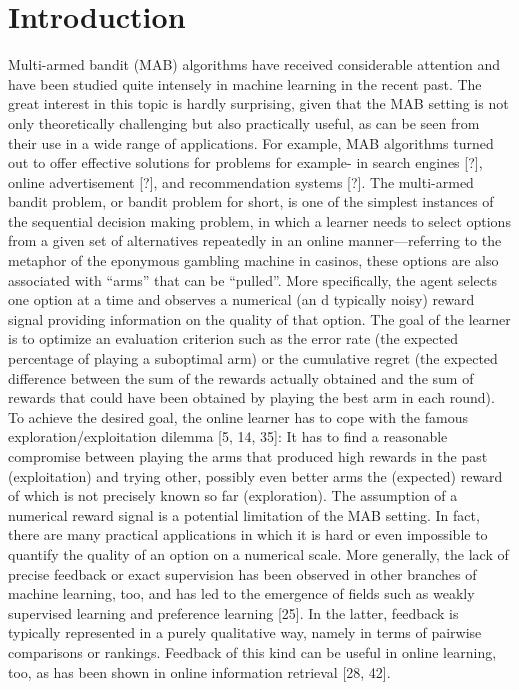 \documentclass{llncs}
\begin{document}
\section{Introduction}
	Multi-armed bandit (MAB) algorithms have received considerable attention and have been studied quite intensely in machine learning in the recent past. 
	The great interest in this topic is hardly surprising, given that the MAB setting is not only theoretically challenging but also practically useful, as can be seen from their use in a wide range of applications. For example, MAB algorithms turned out to offer effective solutions for problems for example- in search engines [?], online advertisement [?], and recommendation systems [?].
	The multi-armed bandit problem, or bandit problem for short, is one of the simplest instances of the sequential decision making problem, in which a learner needs to select options from a given set of alternatives repeatedly in an online manner—referring to the metaphor of the eponymous gambling machine in casinos, these options are also associated with “arms” that can be “pulled”. 
	More specifically, the agent selects one option at a time and observes a numerical (an d typically noisy) reward signal providing information on the quality of that option. The goal of the learner is to optimize an evaluation criterion such as the error rate (the expected percentage of playing a suboptimal arm) or the cumulative regret (the expected difference between the sum of the rewards actually obtained and the sum of rewards that could have been obtained by playing the best arm in each round).
	To achieve the desired goal, the online learner has to cope with the famous exploration/exploitation dilemma [5, 14, 35]: It has to find a reasonable compromise between playing the arms that produced high rewards in the past (exploitation) and trying other, possibly even better arms the (expected) reward of which is not precisely known so far (exploration).
	The assumption of a numerical reward signal is a potential limitation of the MAB setting. In fact, there are many practical applications in which it is hard or even impossible to quantify the quality of an option on a numerical scale. 
	More generally, the lack of precise feedback or exact supervision has been observed in other branches of machine learning, too, and has led to the emergence of fields such as weakly supervised learning and preference learning [25]. 
	In the latter, feedback is typically represented in a purely qualitative way, namely in terms of pairwise comparisons or rankings. 
	Feedback of this kind can be useful in online learning, too, as has been shown in online information retrieval [28, 42]. 
\end{document}
